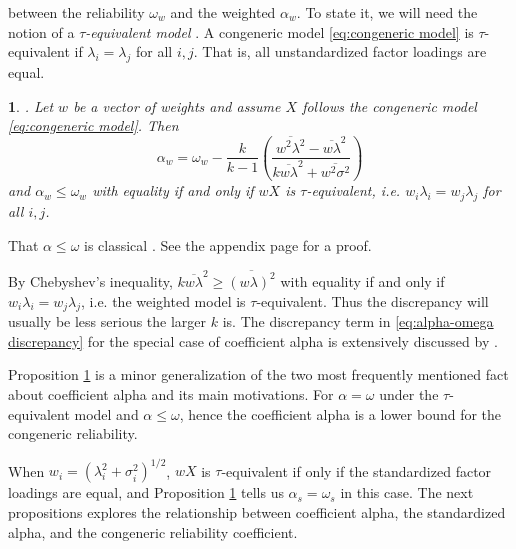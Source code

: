 \documentclass{article}
\makeatletter
\theoremstyle{plain}
\theoremstyle{plain}
\theoremstyle{definition}
\theoremstyle{remark}
\theoremstyle{definition}
\theoremstyle{plain}
\theoremstyle{plain}
\newtheorem{prop}[thm]{\protect\propositionname}
\theoremstyle{definition}
\newenvironment{proof}[1][\protect\proofname]{\par
	\normalfont\topsep6\p@\@plus6\p@\relax
	\trivlist
	\itemindent\parindent
	\item[\hskip\labelsep\scshape #1]\ignorespaces
}{%
	\endtrivlist\@endpefalse
}
\providecommand{\proofname}{Proof}
\providecommand{\propositionname}{Proposition}
\renewcommand{\sqrt}[1]{{(#1)^{1/2}}}
\makeatother
\begin{document}
between the reliability $\omega_{w}$ and the weighted $\alpha_{w}$. To state it, we will need
the notion of a \emph{$\tau$-equivalent model} \citep[][section 2.13]{Lord1968-ax}. A congeneric model \eqref{eq:congeneric model} is $\tau$-equivalent if $\lambda_{i}=\lambda_{j}$ for all $i,j$. That is, all unstandardized
factor loadings are equal.
\begin{prop}
\label{prop:weighted alpha}. Let $w$ be a vector of weights and
assume $X$ follows the congeneric model \eqref{eq:congeneric model}. Then 
\begin{equation}
\alpha_{w}=\omega_{w}-\frac{k}{k-1}\left(\frac{\overline{w^{2}\lambda^{2}}-\overline{w\lambda}^{2}}{k\overline{w\lambda}^{2}+\overline{w^{2}\sigma^{2}}}\right)\label{eq:alpha-omega discrepancy}
\end{equation}
and $\alpha_w \leq \omega_w$ with equality if and only if $wX$ is $\tau$-equivalent, i.e. $w_i\lambda_{i}=w_j\lambda_{j}$
for all $i,j$.
\end{prop}
\begin{proof}
That  $\alpha \leq \omega$ is classical \citep[][pp. 87 -- 89]{Lord1968-ax}. See the appendix page \pageref{proof:weighted alpha}
for a proof.
\end{proof}

By Chebyshev's inequality, $k\overline{w\lambda}^{2}\geq\overline{(w\lambda)^{2}}$
with equality if and only if $w_{i}\lambda_{i}=w_{j}\lambda_{j}$,
i.e. the weighted model is $\tau$-equivalent. Thus the discrepancy
will usually be less serious the larger $k$ is. The discrepancy term in \eqref{eq:alpha-omega discrepancy} for the special case of coefficient alpha is extensively discussed by \citet{Raykov1997-bu}. 

Proposition \ref{prop:weighted alpha} is a minor generalization of the two most frequently mentioned fact about coefficient alpha and its main motivations. For $\alpha = \omega$ under the $\tau$-equivalent model and
$\alpha \leq \omega$, hence the coefficient alpha is a lower bound for the congeneric reliability.
 
When $w_{i}=\sqrt{\lambda_{i}^{2}+\sigma_{i}^{2}}$, $wX$ is $\tau$-equivalent if only if the standardized factor loadings are equal, and Proposition \ref{prop:weighted alpha} tells us $\alpha_s = \omega_s$ in this case. 
The next propositions explores the relationship between coefficient alpha, the standardized alpha, and the congeneric reliability coefficient.
\end{document}
